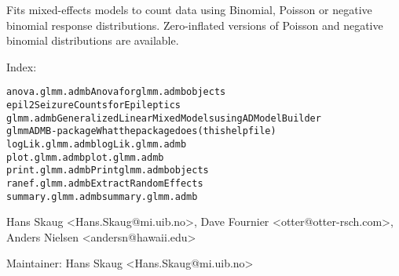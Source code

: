 \begin{Description}\relax
Fits mixed-effects models to count data using Binomial, Poisson or
negative binomial response distributions. Zero-inflated versions of 
Poisson and negative binomial distributions are available.
\end{Description}
\begin{Details}\relax
{}

Index:
\begin{alltt}
anova.glmm.admb         Anova for glmm.admb objects
epil2                   Seizure Counts for Epileptics
glmm.admb               Generalized Linear Mixed Models using AD Model Builder
glmmADMB-package        What the package does (this help file)
logLik.glmm.admb        logLik.glmm.admb
plot.glmm.admb          plot.glmm.admb
print.glmm.admb         Print glmm.admb objects
ranef.glmm.admb         Extract Random Effects
summary.glmm.admb       summary.glmm.admb
\end{alltt}
\end{Details}
\begin{Author}\relax
Hans Skaug <Hans.Skaug@mi.uib.no>, Dave Fournier
<otter@otter-rsch.com>, Anders Nielsen <andersn@hawaii.edu>

Maintainer: Hans Skaug <Hans.Skaug@mi.uib.no>
\end{Author}


